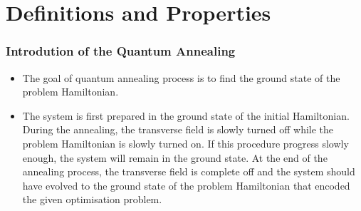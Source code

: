 \documentclass{beamer}
\begin{document}
\section{Definitions and Properties}
%	
%	
%		

\begin{frame}
	\frametitle{Introdution of the Quantum Annealing}
	\begin{itemize}
		\item 	The goal of quantum annealing process is to find the ground state of the problem Hamiltonian.
		\item   The system is first prepared in the ground state of the initial Hamiltonian. During the annealing, the
		transverse field is slowly turned off while the problem Hamiltonian is slowly turned on. If this procedure
		progress slowly enough, the system will remain in the ground state. At the end of the annealing process,
		the transverse field is complete off and the system should have evolved to the ground state of the problem
		Hamiltonian that encoded the given optimisation problem.
	\end{itemize}

	
	
\end{frame}
\end{document}

